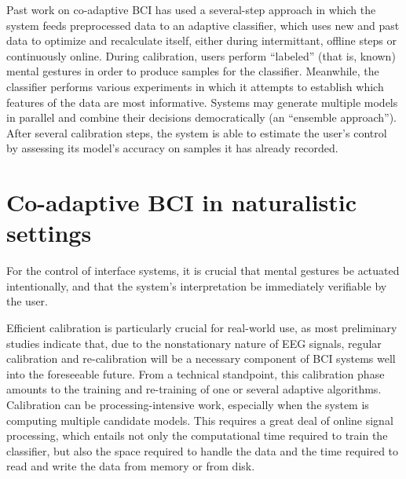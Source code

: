 Past work on co-adaptive BCI has used a several-step approach in which the system feeds preprocessed data to an adaptive classifier, which uses new and past data to optimize and recalculate itself, either during intermittant, offline steps or continuously online. \cite{vidaurre_fully_2006,shijian_lu_unsupervised_2009,das_unsupervised_2013} During calibration, users perform ``labeled'' (that is, known) mental gestures in order to produce samples for the classifier. Meanwhile, the classifier performs various experiments in which it attempts to establish which features of the data are most informative. Systems may generate multiple models in parallel and combine their decisions democratically (an ``ensemble approach''). After several calibration steps, the system is able to estimate the user's control by assessing its model's accuracy on samples it has already recorded.

\section{Co-adaptive BCI in naturalistic settings}

For the control of interface systems, it is crucial that mental gestures be actuated intentionally, and that the system's interpretation be immediately verifiable by the user. \cite{mcfarland_brain-computer_2011,ali_empirical_2014}


Efficient calibration is particularly crucial for real-world use, as most preliminary studies indicate that, due to the nonstationary nature of EEG signals, regular calibration and re-calibration will be a necessary component of BCI systems well into the foreseeable future. From a technical standpoint, this calibration phase amounts to the training and re-training of one or several adaptive algorithms. Calibration can be processing-intensive work, especially when the system is computing multiple candidate models. This requires a great deal of online signal processing, which entails not only the computational time required to train the classifier, but also the space required to handle the data and the time required to read and write the data from memory or from disk. 




